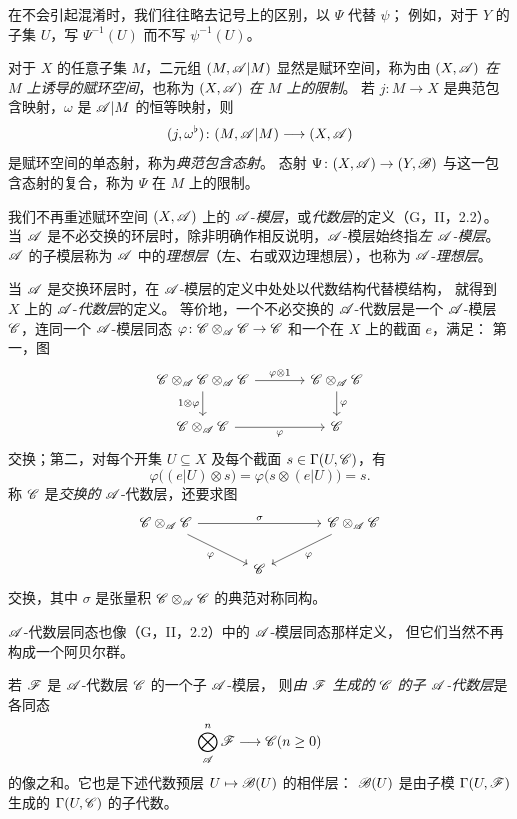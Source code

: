 在不会引起混淆时，我们往往略去记号上的区别，以 $\Psi$ 代替 $\psi$；
例如，对于 $Y$ 的子集 $U$，写 $\Psi^{-1}(U)$ 而不写 $\psi^{-1}(U)$。

对于 $X$ 的任意子集 $M$，二元组 $(M,\mathscr A|M)$ 显然是赋环空间，称为由 $(X,\mathscr A)$
\emph{在 $M$ 上诱导的赋环空间}，也称为 $(X,\mathscr A)$ \emph{在 $M$ 上的限制}。
若 $j\colon M\to X$ 是典范包含映射，$\omega$ 是 $\mathscr A|M$ 的恒等映射，则
\[
 (j,\omega^\flat)\colon(M,\mathscr A|M)\longrightarrow(X,\mathscr A)
\]
是赋环空间的单态射，称为\emph{典范包含态射}。
态射 $\Psi\colon(X,\mathscr A)\to(Y,\mathscr B)$ 与这一包含态射的复合，称为 $\Psi$ 在 $M$ 上的限制。

我们不再重述赋环空间 $(X,\mathscr A)$ 上的 $\mathscr A$-\emph{模层}，或\emph{代数层}的定义（G，II，2.2）。
当 $\mathscr A$ 是不必交换的环层时，除非明确作相反说明，$\mathscr A$-模层始终指\emph{左 $\mathscr A$-模层}。
$\mathscr A$ 的子模层称为 $\mathscr A$ 中的\emph{理想层}（左、右或双边理想层），也称为 $\mathscr A$-\emph{理想层}。

当 $\mathscr A$ 是交换环层时，在 $\mathscr A$-模层的定义中处处以代数结构代替模结构，
就得到 $X$ 上的 $\mathscr A$-\emph{代数层}的定义。
等价地，一个不必交换的 $\mathscr A$-代数层是一个 $\mathscr A$-模层 $\mathscr C$，连同一个 $\mathscr A$-模层同态
$\varphi\colon\mathscr C\otimes_{\mathscr A}\mathscr C\to\mathscr C$ 和一个在 $X$ 上的截面 $e$，满足：
第一，图
\[
\begin{tikzcd}[column sep=large]
\C\otimes_{\A}\C\otimes_{\A}\C
 \arrow[r,"\varphi\otimes1"]\arrow[d,"1\otimes\varphi"'] &
\C\otimes_{\A}\C\arrow[d,"\varphi"]\\
\C\otimes_{\A}\C\arrow[r,"\varphi"'] & \C
\end{tikzcd}
\]
交换；第二，对每个开集 $U\subseteq X$ 及每个截面 $s\in\Gamma(U,\mathscr C)$，有
\[
 \varphi\bigl((e|U)\otimes s\bigr)
 =\varphi\bigl(s\otimes(e|U)\bigr)=s.
\]
称 $\mathscr C$ 是\emph{交换的} $\mathscr A$-代数层，还要求图
\[
\begin{tikzcd}[column sep=large]
 \C\otimes_{\A}\C\arrow[rr,"\sigma"]\arrow[dr,"\varphi"']&&
 \C\otimes_{\A}\C\arrow[dl,"\varphi"]\\
 &\C&
\end{tikzcd}
\]
交换，其中 $\sigma$ 是张量积 $\mathscr C\otimes_{\mathscr A}\mathscr C$ 的典范对称同构。

$\mathscr A$-代数层同态也像（G，II，2.2）中的 $\mathscr A$-模层同态那样定义，
但它们当然不再构成一个阿贝尔群。

若 $\mathscr F$ 是 $\mathscr A$-代数层 $\mathscr C$ 的一个子 $\mathscr A$-模层，
则\emph{由 $\mathscr F$ 生成的 $\mathscr C$ 的子 $\mathscr A$-代数层}是各同态
\[
 \bigotimes_{\mathscr A}^{n}\mathscr F\longrightarrow\mathscr C(n\geq0)
\]
的像之和。它也是下述代数预层 $U\mapsto\mathscr B(U)$ 的相伴层：
$\mathscr B(U)$ 是由子模 $\Gamma(U,\mathscr F)$ 生成的 $\Gamma(U,\mathscr C)$ 的子代数。

